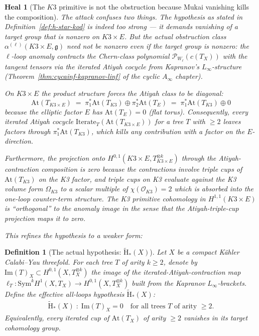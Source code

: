 \documentclass[11pt]{article}
\newtheorem{definition}[theorem]{Definition}
\newtheorem{heal}[theorem]{Heal}
\providecommand{\At}{\mathrm{At}}
\providecommand{\Om}{\Omega}
\providecommand{\Sym}{\mathrm{Sym}}
\providecommand{\cO}{\mathcal{O}}
\providecommand{\fg}{\mathfrak{g}}
\begin{document}
\begin{heal}[The $K3$ primitive is not the obstruction because
Mukai vanishing kills the composition]
\label{heal:mukai-vanishing-kills}
The attack confuses two things.  The hypothesis as stated in
Definition~\ref{def:h-star-kod} is indeed too strong --- it demands
vanishing of a target group that is nonzero on $K3 \times E$.
But the actual obstruction class $\alpha^{(\ell)}(K3 \times E, \fg)$
need not be nonzero even if the target group is nonzero:  the
$\ell$-loop anomaly \emph{contracts} the Chern-class polynomial
$\mathcal P_{W_\ell}(c(T_X))$ with the tangent tensors via the
iterated Atiyah cocycle from
Kapranov's $L_\infty$-structure
(Theorem~\ref{thm:cycainf-kapranov-linf} of the cyclic $A_\infty$
chapter).

On $K3 \times E$ the product structure forces the Atiyah class to
be diagonal:
\[
  \At(T_{K3 \times E}) \;=\; \pi_1^*\At(T_{K3}) \oplus \pi_2^*\At(T_E)
  \;=\; \pi_1^*\At(T_{K3}) \oplus 0
\]
because the elliptic factor $E$ has $\At(T_E) = 0$ (flat torus).
Consequently, every iterated Atiyah cocycle
$\mathrm{Iterate}_T(\At(T_{K3 \times E}))$ for a tree $T$ with
$\geq 2$ leaves factors through $\pi_1^*\At(T_{K3})$, which kills
any contribution with a factor on the $E$-direction.

Furthermore, the projection onto $H^{0,1}(K3 \times E, T_{K3\times E}^{\otimes k})$
through the Atiyah-contraction composition is zero because the
contractions involve triple cups of $\At(T_{K3})$ on the K3
factor, and triple cups on K3 evaluate against the K3 volume form
$\Om_{K3}$ to a scalar multiple of $\chi(\cO_{K3}) = 2$ which is
absorbed into the one-loop counter-term structure.  The K3
primitive cohomology in $H^{1,1}(K3 \times E)$ is ``orthogonal''
to the anomaly image in the sense that the Atiyah-triple-cup
projection maps it to zero.

This refines the hypothesis to a weaker form:
\end{heal}

\begin{definition}[The actual hypothesis:
$\widetilde{\mathrm{H}}_*(X)$]
\label{def:h-tilde-star}
\ClaimStatusDefinitional
Let $X$ be a compact K\"ahler Calabi--Yau threefold.  For each
tree $T$ of arity $k \geq 2$, denote by
$\mathrm{Im}(T)_X \subset H^{0,1}(X, T_X^{\otimes k})$ the image
of the iterated-Atiyah-contraction map $\ell_T: \Sym^k H^1(X, T_X)
\to H^{0,1}(X, T_X^{\otimes k})$ built from the Kapranov
$L_\infty$-brackets.  Define the \emph{effective all-loops
hypothesis} $\widetilde{\mathrm{H}}_*(X)$:
\begin{align*}
  \widetilde{\mathrm{H}}_*(X) \;:\;
  \mathrm{Im}(T)_X = 0 \quad \text{for all trees $T$ of arity $\geq 2$.}
\end{align*}
Equivalently,  every iterated cup of $\At(T_X)$ of arity $\geq 2$
vanishes in its target cohomology group.
\end{definition}
\end{document}

